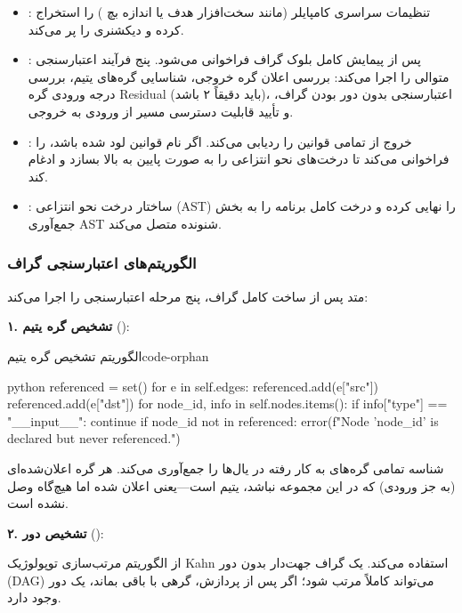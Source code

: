 \documentclass{nngraph-fa}
\begin{document}
\begin{itemize}
    \item \textbf{}: تنظیمات سراسری کامپایلر (مانند سخت‌افزار هدف  یا اندازه بچ ) را استخراج کرده و دیکشنری  را پر می‌کند.
    \item \textbf{}: پس از پیمایش کامل بلوک گراف فراخوانی می‌شود. پنج فرآیند اعتبارسنجی متوالی را اجرا می‌کند: بررسی اعلان گره خروجی، شناسایی گره‌های یتیم، بررسی درجه ورودی گره Residual (باید دقیقاً ۲ باشد)، اعتبارسنجی بدون دور بودن گراف، و تأیید قابلیت دسترسی مسیر از ورودی به خروجی.
    \item \textbf{}: خروج از تمامی قوانین را ردیابی می‌کند. اگر نام قوانین لود شده باشد،  را فراخوانی می‌کند تا درخت‌های نحو انتزاعی را به صورت پایین به بالا بسازد و ادغام کند.
    \item \textbf{}: ساختار درخت نحو انتزاعی (AST) را نهایی کرده و درخت کامل برنامه را به بخش جمع‌آوری AST شنونده متصل می‌کند.
\end{itemize}

\subsubsection{الگوریتم‌های اعتبارسنجی گراف}

متد  پس از ساخت کامل گراف، پنج مرحله اعتبارسنجی را اجرا می‌کند:

\textbf{۱. تشخیص گره یتیم} ():

\begin{codebox}{الگوریتم تشخیص گره یتیم}{code-orphan}
\begin{amzcode}{python}
referenced = set()
for e in self.edges:
    referenced.add(e["src"])
    referenced.add(e["dst"])
for node_id, info in self.nodes.items():
    if info["type"] == "__input__":
        continue
    if node_id not in referenced:
        error(f"Node '{node_id}' is declared but never referenced.")
\end{amzcode}
\end{codebox}

شناسه تمامی گره‌های به کار رفته در یال‌ها را جمع‌آوری می‌کند. هر گره اعلان‌شده‌ای (به جز ورودی) که در این مجموعه نباشد، یتیم است---یعنی اعلان شده اما هیچ‌گاه وصل نشده است.

\textbf{۲. تشخیص دور} ():

از الگوریتم مرتب‌سازی توپولوژیک Kahn استفاده می‌کند. یک گراف جهت‌دار بدون دور (DAG) می‌تواند کاملاً مرتب شود؛ اگر پس از پردازش، گرهی با  باقی بماند، یک دور وجود دارد.
\end{document}
